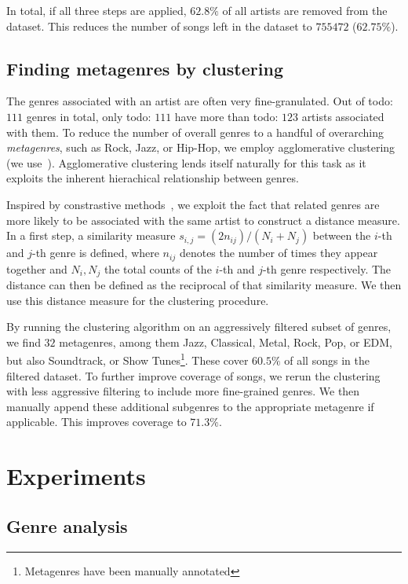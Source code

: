 \documentclass{article}
\newcommand{\todo}[1]{{\color{red}todo: #1}}
\begin{document}
In total, if all three steps are applied, $62.8\%$ of all artists are removed from the dataset. This reduces the number of songs left in the dataset to $755472$ ($62.75\%$).

\subsection{Finding metagenres by clustering}
\label{sec:genre_clustering}
The genres associated with an artist are often very fine-granulated. Out of \todo{$111$} genres in total, only \todo{$111$} have more than \todo{$123$} artists associated with them. To reduce the number of overall genres to a handful of overarching \emph{metagenres}, such as Rock, Jazz, or Hip-Hop, we employ agglomerative clustering~\cite{ward1963hierarchical} (we use~\cite{scikit-learn}). Agglomerative clustering lends itself naturally for this task as it exploits the inherent hierachical relationship between genres.

Inspired by constrastive methods~\cite{mikolov2013efficient, chen2020simple}, we exploit the fact that related genres are more likely to be associated with the same artist to construct a distance measure. In a first step, a similarity measure $s_{i, j} = (2 n_{ij}) / (N_i + N_j)$ between the $i$-th and $j$-th genre is defined, where $n_{ij}$ denotes the number of times they appear together and $N_i, N_j$ the total counts of the $i$-th and $j$-th genre respectively. The distance can then be defined as the reciprocal of that similarity measure. We then use this distance measure for the clustering procedure.

By running the clustering algorithm on an aggressively filtered subset of genres, we find $32$ metagenres, among them Jazz, Classical, Metal, Rock, Pop, or EDM, but also Soundtrack, or Show Tunes\footnote{Metagenres have been manually annotated}. These cover $60.5\%$ of all songs in the filtered dataset. To further improve coverage of songs, we rerun the clustering with less aggressive filtering to include more fine-grained genres. We then manually append these additional subgenres to the appropriate metagenre if applicable. This improves coverage to $71.3\%$.

\section{Experiments}

\subsection{Genre analysis}
\end{document}
